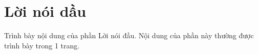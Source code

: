 \chapter*{Lời nói dầu}
\thispagestyle{empty}

Trình bày nội dung của phần Lời nói đầu. Nội dung của phần này thường được trình bày trong 1 trang.